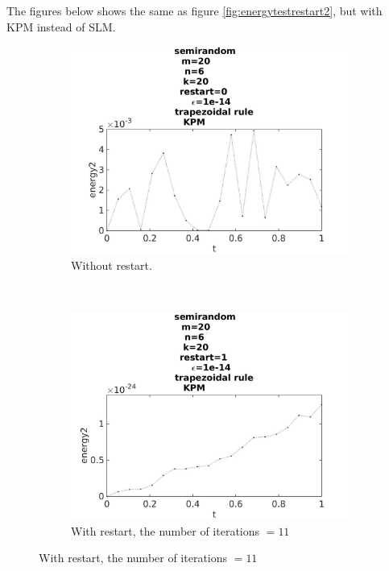 The figures below shows the same as figure \ref{fig:energytestrestart2}, but with KPM instead of SLM. 

\begin{figure}[H]
        \centering
        \begin{subfigure}[b]{0.45\textwidth}
                \includegraphics[width=\textwidth]{../MATLAB/fig/energyarnrestart02.jpg}
                \caption{  Without restart. }
                \label{fig:energyarnrestart02}
        \end{subfigure}%
        ~
        \begin{subfigure}[b]{0.45\textwidth}
                \includegraphics[width=\textwidth]{../MATLAB/fig/energyarnrestart12.jpg}
                \caption{ With restart, the number of iterations $ = 11$ }
                \label{fig:energyarnrestart1}
        \end{subfigure}
        

\end{figure}
